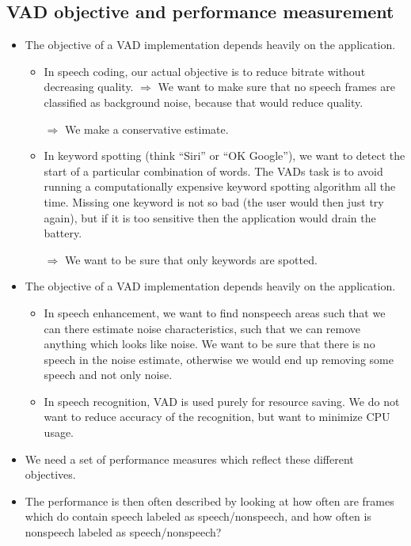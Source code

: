 \documentclass[letterpaper,10pt,english]{jupyterBook}
\begin{document}
\subsection{VAD objective and performance measurement}
\label{\detokenize{Recognition/Voice_activity_detection:vad-objective-and-performance-measurement}}\begin{itemize}
\item {} 
\sphinxAtStartPar
The objective of a VAD implementation depends heavily on the
application.
\begin{itemize}
\item {} 
\sphinxAtStartPar
In speech coding, our actual objective is to reduce bitrate
without decreasing quality. \(\Rightarrow\) We want to make sure
that no speech frames are classified as background noise,
because that would reduce quality.

\sphinxAtStartPar
\(\Rightarrow\) We make a conservative estimate.

\item {} 
\sphinxAtStartPar
In keyword spotting (think “Siri” or “OK Google”), we want to
detect the start of a particular combination of words. The VADs
task is to avoid running a computationally expensive keyword
spotting algorithm all the time. Missing one keyword is not so
bad (the user would then just try again), but if it is too
sensitive then the application would drain the battery.

\sphinxAtStartPar
\(\Rightarrow\) We want to be sure that only keywords are spotted.

\end{itemize}

\item {} 
\sphinxAtStartPar
The objective of a VAD implementation depends heavily on the
application.
\begin{itemize}
\item {} 
\sphinxAtStartPar
In speech enhancement, we want to find non\sphinxhyphen{}speech areas such
that we can there estimate noise characteristics, such that we
can remove anything which looks like noise. We want to be sure
that there is no speech in the noise estimate, otherwise we
would end up removing some speech and not only noise.

\item {} 
\sphinxAtStartPar
In speech recognition, VAD is used purely for resource saving.
We do not want to reduce accuracy of the recognition, but want
to minimize CPU usage.

\end{itemize}

\item {} 
\sphinxAtStartPar
We need a set of performance measures which reflect these different
objectives.

\item {} 
\sphinxAtStartPar
The performance is then often described by looking at how often are
frames which do contain speech labeled as speech/non\sphinxhyphen{}speech, and how
often is non\sphinxhyphen{}speech labeled as speech/non\sphinxhyphen{}speech?

\end{itemize}
\end{document}
